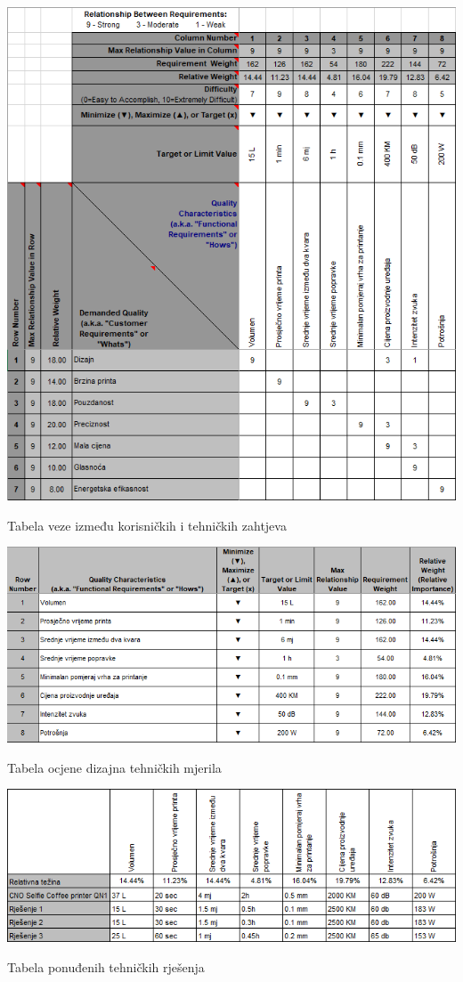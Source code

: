 \documentclass[12pt]{article}
\begin{document}
\begin{table}
\includegraphics[width=\textwidth]{tabela_sredina}
\caption{Tabela veze između korisničkih i tehničkih zahtjeva}
\end{table}

\begin{table}
\includegraphics[width=\textwidth]{tabela_zakljucak}
\caption{Tabela ocjene dizajna tehničkih mjerila}
\end{table}

\begin{table}
\includegraphics[width=\textwidth]{tabela_donja}
\caption{Tabela ponuđenih tehničkih rješenja}
\label{tabela ponudjenih rjesenja}
\end{table}
\end{document}
